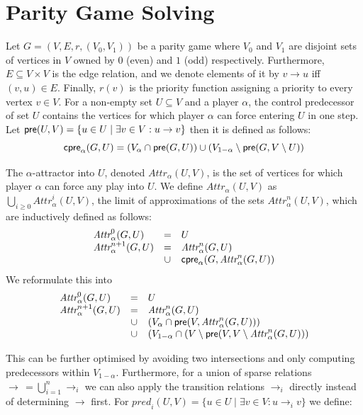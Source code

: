 \documentclass{article}
\newcommand{\attrsym}{\ensuremath{\textit{Attr}}}
\newcommand{\attr}[3][]{\ensuremath{\attrsym^{#1}_{#2}(#3)}}
\newcommand{\pred}{\ensuremath{\textit{pred}}}
\begin{document}
\newpage
\section{Parity Game Solving}

Let $G = (V, E, r, (V_0, V_1))$ be a parity game where $V_0$ and $V_1$ are disjoint sets of vertices in $V$ owned by $0$ (even) and $1$ (odd) respectively.
Furthermore, $E \subseteq V \times V$ is the edge relation, and we denote elements of it by $v \rightarrow u$ iff $(v, u) \in E$.
Finally, $r(v)$ is the priority function assigning a priority to every vertex $v \in V$.
For a non-empty set $U \subseteq V$ and a player $\alpha$, the control predecessor of set $U$ contains the vertices for which player $\alpha$ can force entering $U$ in one step.
Let $\textsf{pre}(U,V) = \{ u \in U \mid \exists v \in V: u \rightarrow v \}$ then it is defined as follows:
\begin{equation*}
  \textsf{cpre}_{\alpha}(G,U) = (V_{\alpha} \cap \textsf{pre}(G,U)) \cup (V_{1-\alpha} \setminus \textsf{pre}(G,V \setminus U))
\end{equation*}

The $\alpha$-attractor into $U$, denoted $\attr{\alpha}{U,V}$, is the set of vertices for which player $\alpha$ can force any play into $U$. 
We define $\attr{\alpha}{U,V}$ as $\bigcup\limits_{i \ge 0} \attr[i]{\alpha}{U,V}$, the limit of approximations\label{def:attractor} of the sets $\attr[n]{\alpha}{U,V}$, which are inductively defined as follows:
\[
\begin{array}{lcl}
\attr[0]{\alpha}{G, U} & = & U \\
\attr[n+1]{\alpha}{G, U} & = & \attr[n]{\alpha}{G, U} \\
      & \cup & \cpre{\alpha}{G}{\attr[n]{\alpha}{G, U}} \\
\end{array}
\]
We reformulate this into
\[
\begin{array}{lcl}
\attr[0]{\alpha}{G, U} & = & U \\
\attr[n+1]{\alpha}{G, U} & = & \attr[n]{\alpha}{G, U} \\
      & \cup & (V_{\alpha} \cap \pre{V}{\attr[n]{\alpha}{G, U})} \\
      & \cup & (V_{1 - \alpha} \cap (V \setminus \pre{V}{V \setminus \attr[n]{\alpha}{G, U})} \\
\end{array}
\]

This can be further optimised by avoiding two intersections and only computing predecessors within $V_{1 - \alpha}$. 
Furthermore, for a union of sparse relations $\rightarrow \,= \bigcup_{i=1}^{n} \rightarrow_i$ we can also apply the transition relations $\rightarrow_i$ directly instead of determining $\rightarrow$ first.
For $\pred_i(U, V) = \{ u \in U \mid \exists v \in V: u \rightarrow_i v \}$ we define:
\end{document}
